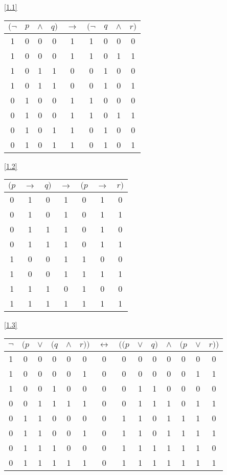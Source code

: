 \documentclass[boxes]{homework}
\begin{document}
\begin{solution}
\ref{1.1}
\begin{center}
    \begin{tabular}{cccc|c|cccc}
        $(\lnot$ & $p$ & $\land$ & $q)$ & $\to$ & $(\lnot$ & $q$ & $\land$ & $r)$\\
        \hline
        1 & 0 & 0 & 0 & 1 & 1 & 0 & 0 & 0\\
        1 & 0 & 0 & 0 & 1 & 1 & 0 & 1 & 1\\
        1 & 0 & 1 & 1 & 0 & 0 & 1 & 0 & 0\\
        1 & 0 & 1 & 1 & 0 & 0 & 1 & 0 & 1\\
        0 & 1 & 0 & 0 & 1 & 1 & 0 & 0 & 0\\
        0 & 1 & 0 & 0 & 1 & 1 & 0 & 1 & 1\\
        0 & 1 & 0 & 1 & 1 & 0 & 1 & 0 & 0\\
        0 & 1 & 0 & 1 & 1 & 0 & 1 & 0 & 1
    \end{tabular}
\end{center}
\ref{1.2}
\begin{center}
    \begin{tabular}{ccc|c|ccc}
        $(p$ & $\to$ & $q)$ & $\to$ & $(p$ & $\to$ & $r)$ \\
        \hline
        0 & 1 & 0 & 1 & 0 & 1 & 0\\
        0 & 1 & 0 & 1 & 0 & 1 & 1\\
        0 & 1 & 1 & 1 & 0 & 1 & 0\\
        0 & 1 & 1 & 1 & 0 & 1 & 1\\
        1 & 0 & 0 & 1 & 1 & 0 & 0\\
        1 & 0 & 0 & 1 & 1 & 1 & 1\\
        1 & 1 & 1 & 0 & 1 & 0 & 0\\
        1 & 1 & 1 & 1 & 1 & 1 & 1
    \end{tabular}
\end{center}
\ref{1.3}
\begin{center}
    \begin{tabular}{cccccc|c|ccccccc}
        $\lnot$ & $(p$ & $\lor$ & $(q$ & $\land$ & $r))$ & $\leftrightarrow$ & $((p$ & $\lor$ & $q)$ & $\land$ & $(p$ & $\lor$ & $r))$\\
        \hline
        1 & 0 & 0 & 0 & 0 & 0 & 0 & 0 & 0 & 0 & 0 & 0 & 0 & 0\\
        1 & 0 & 0 & 0 & 0 & 1 & 0 & 0 & 0 & 0 & 0 & 0 & 1 & 1\\
        1 & 0 & 0 & 1 & 0 & 0 & 0 & 0 & 1 & 1 & 0 & 0 & 0 & 0\\
        0 & 0 & 1 & 1 & 1 & 1 & 0 & 0 & 1 & 1 & 1 & 0 & 1 & 1\\
        0 & 1 & 1 & 0 & 0 & 0 & 0 & 1 & 1 & 0 & 1 & 1 & 1 & 0\\
        0 & 1 & 1 & 0 & 0 & 1 & 0 & 1 & 1 & 0 & 1 & 1 & 1 & 1\\
        0 & 1 & 1 & 1 & 0 & 0 & 0 & 1 & 1 & 1 & 1 & 1 & 1 & 0\\
        0 & 1 & 1 & 1 & 1 & 1 & 0 & 1 & 1 & 1 & 1 & 1 & 1 & 1\\
    \end{tabular}
\end{center}
\end{solution}
\end{document}

